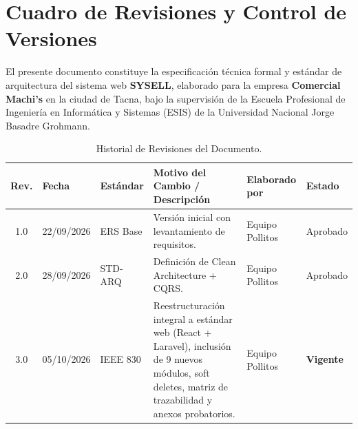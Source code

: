 \documentclass[11pt,a4paper]{article}
\begin{document}


\setcounter{page}{2}

\section*{Cuadro de Revisiones y Control de Versiones}

El presente documento constituye la especificación técnica formal y estándar de arquitectura del sistema web \textbf{SYSELL}, elaborado para la empresa \textbf{Comercial Machi's} en la ciudad de Tacna, bajo la supervisión de la Escuela Profesional de Ingeniería en Informática y Sistemas (ESIS) de la Universidad Nacional Jorge Basadre Grohmann.

\vspace{0.3cm}
\begin{table}[H]
\centering
\small
\begin{tabularx}{\linewidth}{cll>{\raggedright\arraybackslash}Xll}
\toprule
\rowcolor{LightSlate}
\textbf{Rev.} & \textbf{Fecha} & \textbf{Estándar} & \textbf{Motivo del Cambio / Descripción} & \textbf{Elaborado por} & \textbf{Estado} \\
\midrule
1.0 & 22/09/2026 & ERS Base & Versión inicial con levantamiento de requisitos. & Equipo Pollitos & Aprobado \\
2.0 & 28/09/2026 & STD-ARQ & Definición de Clean Architecture + CQRS. & Equipo Pollitos & Aprobado \\
3.0 & 05/10/2026 & IEEE 830 & Reestructuración integral a estándar web (React + Laravel), inclusión de 9 nuevos módulos, soft deletes, matriz de trazabilidad y anexos probatorios. & Equipo Pollitos & \textbf{Vigente} \\
\bottomrule
\end{tabularx}
\caption{Historial de Revisiones del Documento.}
\label{tab:revisiones}
\end{table}

\vspace{0.6cm}
\tableofcontents
\newpage
\end{document}
